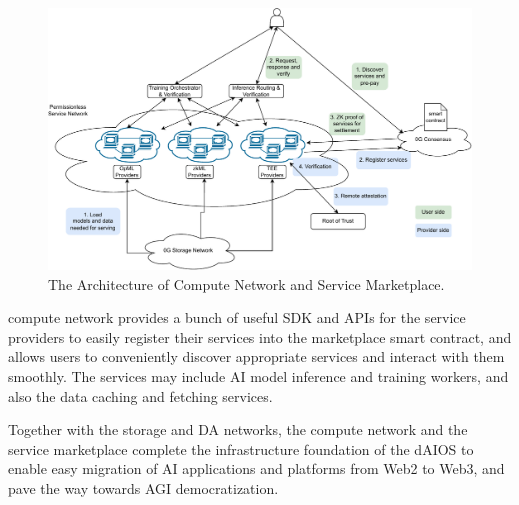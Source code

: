 \begin{figure}[H]	
	\includegraphics[width=\textwidth]{figure/dAIOS.pdf}
	\caption{The Architecture of \projabbrev Compute Network and Service Marketplace.}
	\label{fig:daios}
\end{figure}

\projabbrev compute network provides a bunch of useful SDK and APIs for the service providers to easily register their services into the marketplace smart contract, and allows users to conveniently discover appropriate services and interact with them smoothly. 
The services may include AI model inference and training workers, and also the data caching and fetching services.

Together with the \projabbrev storage and DA networks, the \projabbrev compute network and the service marketplace complete the infrastructure foundation of the dAIOS to enable easy migration of AI applications and platforms from Web2 to Web3, and pave the way towards AGI democratization.

